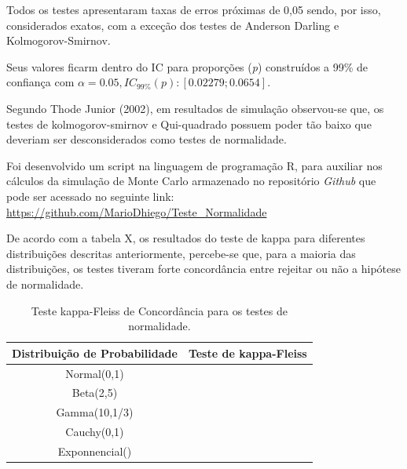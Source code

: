 \documentclass[a4paper,11pt]{article} %
\begin{document}
Todos os testes apresentaram taxas de erros próximas de 0,05 sendo, por isso, considerados exatos, com a exceção dos testes de Anderson Darling e Kolmogorov-Smirnov. \vskip0.3cm

Seus valores ficarm dentro do IC para proporções (\textit{p}) construídos a 99\% de confiança com $\alpha = 0.05, IC_{99\%}(p): [0.02279;0.0654].$
\vskip0.3cm

Segundo Thode Junior (2002), em resultados de simulação observou-se que, os testes de kolmogorov-smirnov e Qui-quadrado possuem poder tão baixo que deveriam ser desconsiderados como testes de normalidade.\vskip0.3cm

Foi desenvolvido um script na linguagem de programação R, para auxiliar nos cálculos da simulação de Monte Carlo armazenado no repositório \textit{Github} que pode ser acessado no seguinte link: \href{https://github.com/MarioDhiego/Teste\_Normalidade}{https://github.com/MarioDhiego/Teste\_Normalidade}

\vskip0.3cm


De acordo com a tabela X, os resultados do teste de kappa para diferentes distribuições descritas anteriormente, percebe-se que, para a maioria das distribuições, os testes tiveram forte concordância entre rejeitar ou não a hipótese de normalidade. 



\begin{table}[H]
\centering
 \begin{tabular}{c|c}
\hline \hline
Distribuição de Probabilidade  &  Teste de kappa-Fleiss\\
\hline
      Normal(0,1)              &  \\
      Beta(2,5)                &  \\
      Gamma(10,1/3)            &  \\
      Cauchy(0,1)              &  \\
      Exponnencial()           &  \\
\hline \hline
    \end{tabular}
    \caption{Teste kappa-Fleiss de Concordância para os testes de normalidade.}
    \label{tab:my_label}
\end{table}
\end{document}
